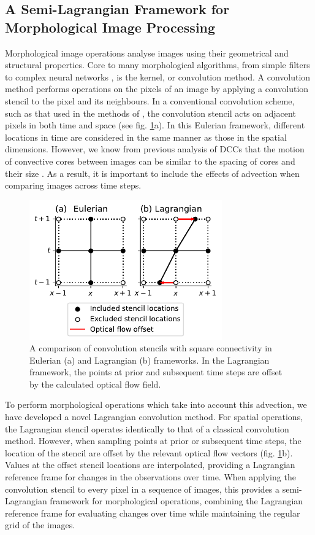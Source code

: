 \documentclass[amt, manuscript]{copernicus}
\begin{document}
\subsection{A Semi-Lagrangian Framework for Morphological Image Processing}

Morphological image operations analyse images using their geometrical and structural properties.
Core to many morphological algorithms, from simple filters to complex neural networks \citep{kalchbrenner_convolutional_2014}, is the kernel, or convolution method.
A convolution method performs operations on the pixels of an image by applying a convolution stencil to the pixel and its neighbours.
In a conventional convolution scheme, such as that used in the methods of \citet{fiolleau_algorithm_2013}, the convolution stencil acts on adjacent pixels in both time and space (see fig. \ref{fig:convolution_kernels}a).
In this Eulerian framework, different locations in time are considered in the same manner as those in the spatial dimensions.
However, we know from previous analysis of DCCs that the motion of convective cores between images can be similar to the spacing of cores and their size \citep{heikenfeld_tobac_2019}.
As a result, it is important to include the effects of advection when comparing images across time steps.


\begin{figure}[t]
    \includegraphics[width=8.3cm]{figure05.pdf}
    \caption{A comparison of convolution stencils with square connectivity in Eulerian (a) and Lagrangian (b) frameworks. In the Lagrangian framework, the points at prior and subsequent time steps are offset by the calculated optical flow field.}
    \label{fig:convolution_kernels}
\end{figure}


To perform morphological operations which take into account this advection, we have developed a novel Lagrangian convolution method.
For spatial operations, the Lagrangian stencil operates identically to that of a classical convolution method.
However, when sampling points at prior or subsequent time steps, the location of the stencil are offset by the relevant optical flow vectors (fig. \ref{fig:convolution_kernels}b).
Values at the offset stencil locations are interpolated, providing a Lagrangian reference frame for changes in the observations over time.
When applying the convolution stencil to every pixel in a sequence of images, this provides a semi-Lagrangian framework for morphological operations, combining the Lagrangian reference frame for evaluating changes over time while maintaining the regular grid of the images.
\end{document}
